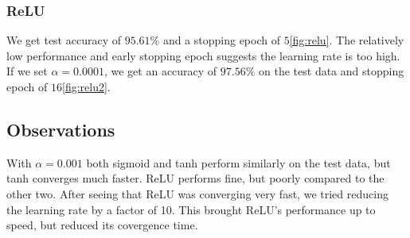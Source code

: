 \subsubsection{ReLU}

We get test accuracy of $95.61\%$ and a stopping epoch of $5$\cref{fig:relu}. The relatively
low performance and early stopping epoch suggests the learning rate is too high. If we set
$\alpha = 0.0001$, we get an accuracy of $97.56\%$ on the test data and stopping
epoch of $16$\cref{fig:relu2}.

\subsection{Observations}

With $\alpha = 0.001$ both sigmoid and tanh perform similarly on the test data, but
tanh converges much faster. ReLU performs fine, but poorly compared to the other two.
After seeing that ReLU was converging very fast, we tried reducing the learning rate
by a factor of 10. This brought ReLU's performance up to speed, but reduced its covergence time.
